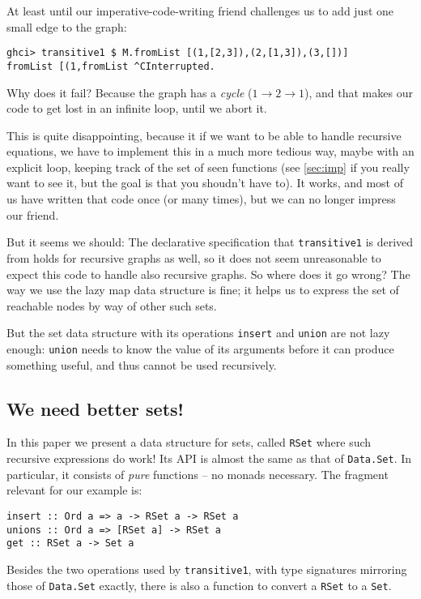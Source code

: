 \documentclass[manuscript,screen,acmsmall]{acmart}
\begin{document}
At least until our imperative-code-writing friend challenges us to add just one small edge to the graph:
\begin{verbatim}
ghci> transitive1 $ M.fromList [(1,[2,3]),(2,[1,3]),(3,[])]
fromList [(1,fromList ^CInterrupted.
\end{verbatim}
Why does it fail? Because the graph has a \emph{cycle} ($1 \to 2 \to 1$), and that makes our code to get lost in an infinite loop, until we abort it.

This is quite disappointing, because it if we want to be able to handle recursive equations, we have to implement this in a much more tedious way, maybe with an explicit loop, keeping track of the set of seen functions (see \cref{sec:imp} if you really want to see it, but the goal is that you shoudn’t have to). It works, and most of us have written that code once (or many times), but we can no longer impress our friend.

But it seems we should: The declarative specification that \verb|transitive1| is derived from holds for recursive graphs as well, so it does not seem unreasonable to expect this code to handle also recursive graphs. So where does it go wrong? The way we use the lazy map data structure is fine; it helps us to express the set of reachable nodes by way of other such sets.

But the set data structure with its operations \verb|insert| and \verb|union| are not lazy enough: \verb|union| needs to know the value of its arguments before it can produce something useful, and thus cannot be used recursively.

\subsection{We need better sets!}

In this paper we present a data structure for sets, called \verb|RSet| where such recursive expressions do work! Its API is almost the same as that of \verb|Data.Set|. In particular, it consists of \emph{pure} functions -- no monads necessary. The fragment relevant for our example is:
\begin{verbatim}
insert :: Ord a => a -> RSet a -> RSet a
unions :: Ord a => [RSet a] -> RSet a
get :: RSet a -> Set a
\end{verbatim}
Besides the two operations used by \verb|transitive1|, with type signatures mirroring those of \verb|Data.Set| exactly, there is also a function to convert a \verb|RSet| to a \verb|Set|.
\end{document}
